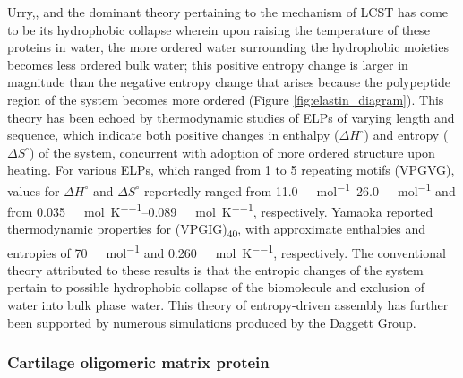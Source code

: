 \begin{refsection}
Urry,\cite{URRY1974,Urry1985}, and the dominant theory pertaining to the
mechanism of LCST has come to be its hydrophobic collapse wherein upon raising
the temperature of these proteins in water, the more ordered water surrounding
the hydrophobic moieties becomes less ordered bulk water; this positive entropy
change is larger in magnitude than the negative entropy change that arises
because the polypeptide region of the system becomes more ordered (Figure
\ref{fig:elastin_diagram}).\cite{Urry1993}
This theory has been echoed by thermodynamic studies of ELPs of varying length
and sequence, which indicate both positive changes in enthalpy (${\Delta
    H^{\circ}}$) and entropy (${\Delta S^{\circ}}$) of the system, concurrent
    with adoption of more ordered structure upon heating.\cite{Reiersen1998} For
    various ELPs, which ranged from 1 to 5 repeating motifs (VPGVG), values for
    ${\Delta H^{\circ}}$ and ${\Delta S^{\circ}}$ reportedly ranged from
    \SIrange{11.0}{26.0}{\kilo\cal\per\mole} and from
    \SIrange{0.035}{0.089}{\kilo\cal\per\mole\per\kelvin},
    respectively.\cite{Reiersen1998} Yamaoka reported thermodynamic properties
    for (VPGIG)\textsubscript{40}, with approximate enthalpies and entropies of
    \SI{70}{\kilo\cal\per\mole} and \SI{0.260}{\kilo\cal\per\mole\per\kelvin},
    respectively.\cite{Yamaoka2003} The conventional theory attributed to these
    results is that the entropic changes of the system pertain to possible
    hydrophobic collapse of the biomolecule and exclusion of water into bulk
    phase water. This theory of entropy-driven assembly has further been
    supported by numerous simulations produced by the Daggett
    Group.\cite{Li2001,Li2003,Li2001a,Li2002a} 

\subsubsection{Cartilage oligomeric matrix protein}
\label{sec:comp}


\end{refsection}
